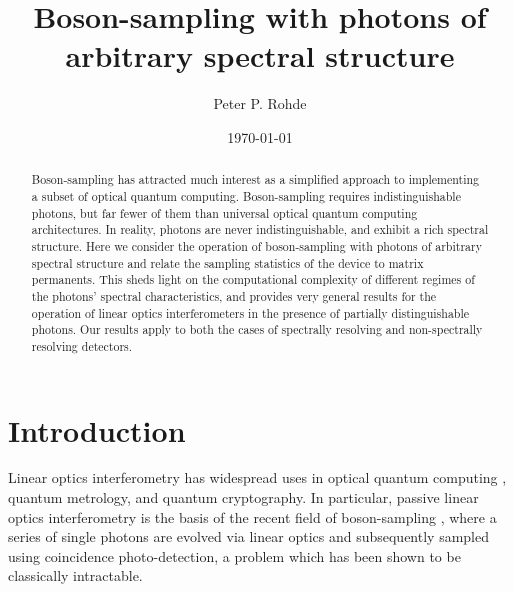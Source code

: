 \documentclass[aps,pra,twocolumn,amsmath,amssymb,nofootinbib,superscriptaddress]{revtex4}
\begin{document}


%
%

\title{Boson-sampling with photons of arbitrary spectral structure}

%
%

\author{Peter P. Rohde}

\date{\today}

\frenchspacing

%
%

\begin{abstract}
Boson-sampling has attracted much interest as a simplified approach to implementing a subset of optical quantum computing. Boson-sampling requires indistinguishable photons, but far fewer of them than universal optical quantum computing architectures. In reality, photons are never indistinguishable, and exhibit a rich spectral structure. Here we consider the operation of boson-sampling with photons of arbitrary spectral structure and relate the sampling statistics of the device to matrix permanents. This sheds light on the computational complexity of different regimes of the photons' spectral characteristics, and provides very general results for the operation of linear optics interferometers in the presence of partially distinguishable photons. Our results apply to both the cases of spectrally resolving and non-spectrally resolving detectors.
\end{abstract}

\maketitle

%
%

\section{Introduction}

Linear optics interferometry has widespread uses in optical quantum computing \cite{bib:KLM01, bib:KokLovett11, bib:NielsenChuang00}, quantum metrology, and quantum cryptography. In particular, passive linear optics interferometry is the basis of the recent field of boson-sampling \cite{bib:AaronsonArkhipov10}, where a series of single photons are evolved via linear optics and subsequently sampled using coincidence photo-detection, a problem which has been shown to be classically intractable.
\end{document}
